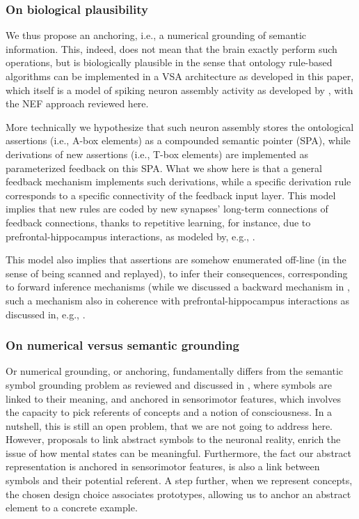\documentclass[sn-mathphys]{sn-jnl}
\begin{document}
\subsubsection{On biological plausibility}

We thus propose an anchoring, i.e., a numerical grounding of semantic information. This, indeed, does not mean that the brain exactly perform such operations, but is biologically plausible in the sense that ontology rule-based algorithms can be implemented in a VSA architecture as developed in this paper, which itself is a model of spiking neuron assembly activity as developed by \cite{eliasmith_how_2013}, with the NEF approach reviewed here.

More technically we hypothesize that such neuron assembly stores the ontological assertions (i.e., A-box elements) as a compounded semantic pointer (SPA), while derivations of new assertions (i.e., T-box elements) are implemented as parameterized feedback on this SPA. What we show here is that a general feedback mechanism implements such derivations, while a specific derivation rule corresponds to a specific connectivity of the feedback input layer.
This model implies that new rules are coded by new synapses' long-term connections of feedback connections, thanks to repetitive learning, for instance, due to prefrontal-hippocampus interactions, as modeled by, e.g., \cite{spens_generative_2023}.

This model also implies that assertions are somehow enumerated off-line (in the sense of being scanned and replayed), to infer their consequences, corresponding to forward inference mechanisms (while we discussed a backward mechanism in \cite{mercier_ontology_2021}, such a mechanism also in coherence with prefrontal-hippocampus interactions as discussed in, e.g., \cite{santos-pata_entorhinal_2021}.

\subsubsection{On numerical versus semantic grounding}

Or numerical grounding, or anchoring, fundamentally differs from the semantic symbol grounding problem as reviewed and discussed in \cite{taddeo_solving_2005}, where symbols are linked to their meaning, and anchored in sensorimotor features, which involves the capacity to pick referents of concepts and a notion of consciousness. In a nutshell, this is still an open problem, that we are not going to address here. However, proposals to link abstract symbols to the neuronal reality, enrich the issue of how mental states can be meaningful. Furthermore, the fact our abstract representation is anchored in sensorimotor features, is also a link between symbols and their potential referent. A step further, when we represent concepts, the chosen design choice associates prototypes, allowing us to anchor an abstract element to a concrete example.
\end{document}
